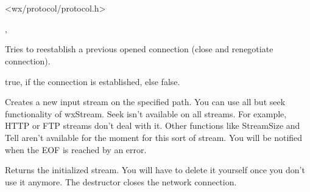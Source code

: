 \section{}\label{wxprotocol}




<wx/protocol/protocol.h>




, 



\label{wxprotocolreconnect}


Tries to reestablish a previous opened connection (close and renegotiate connection).


true, if the connection is established, else false.

\label{wxprotocolgetinput}


Creates a new input stream on the specified path. You can use all but seek
functionality of wxStream. Seek isn't available on all streams. For example,
HTTP or FTP streams don't deal with it. Other functions like StreamSize and
Tell aren't available for the moment for this sort of stream.
You will be notified when the EOF is reached by an error.


Returns the initialized stream. You will have to delete it yourself once you
don't use it anymore. The destructor closes the network connection.


